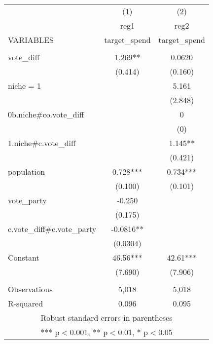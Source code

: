 \documentclass[]{article}
\begin{document}
\begin{tabular}{lcc} \hline
 & (1) & (2) \\
 & reg1 & reg2 \\
VARIABLES & target\_spend & target\_spend \\ \hline
 &  &  \\
vote\_diff & 1.269** & 0.0620 \\
 & (0.414) & (0.160) \\
niche = 1 &  & 5.161 \\
 &  & (2.848) \\
0b.niche\#co.vote\_diff &  & 0 \\
 &  & (0) \\
1.niche\#c.vote\_diff &  & 1.145** \\
 &  & (0.421) \\
population & 0.728*** & 0.734*** \\
 & (0.100) & (0.101) \\
vote\_party & -0.250 &  \\
 & (0.175) &  \\
c.vote\_diff\#c.vote\_party & -0.0816** &  \\
 & (0.0304) &  \\
Constant & 46.56*** & 42.61*** \\
 & (7.690) & (7.906) \\
 &  &  \\
Observations & 5,018 & 5,018 \\
 R-squared & 0.096 & 0.095 \\ \hline
\multicolumn{3}{c}{ Robust standard errors in parentheses} \\
\multicolumn{3}{c}{ *** p$<$0.001, ** p$<$0.01, * p$<$0.05} \\
\end{tabular}
\end{document}
